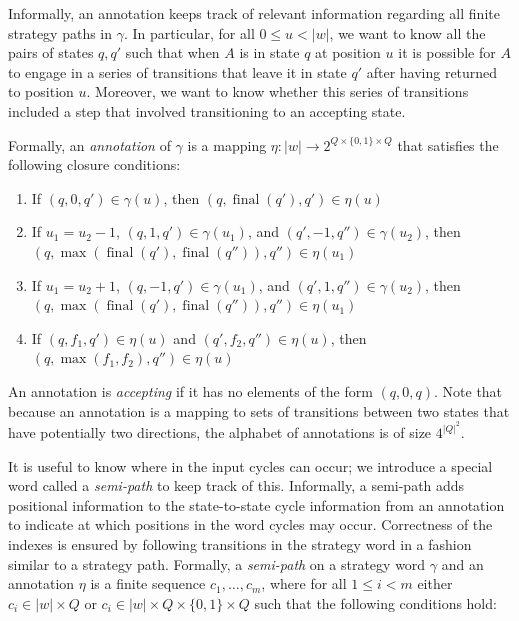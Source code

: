 \documentclass{lmcs}
\theoremstyle{definition}
\DeclareMathOperator{\?}{?}
\DeclareMathOperator{\final}{final}
\begin{document}
Informally, an annotation keeps track of relevant information regarding all finite strategy paths in $\gamma$. In particular,
for all $0 \leq u < |w|$, we want to know all the pairs of states $q,q'$ such that when $A$ is in state $q$ at
position $u$ it is possible for $A$ to engage in a series of transitions that leave it in state $q'$
after having returned to position $u$. Moreover, we want to know whether this series of transitions included a
step that involved transitioning to an accepting state.

Formally, an \textit{annotation}
of $\gamma$ is a mapping $\eta : |w| \rightarrow 2^{Q \times \{ 0,1 \} \times Q}$ that satisfies the
following closure conditions:

\begin{enumerate}
    \item If $(q,0,q') \in \gamma(u)$, then $(q,\final(q'),q') \in \eta(u)$

    \item If $u_1 = u_2 - 1$, $(q,1,q') \in \gamma(u_1)$, and $(q',-1,q'') \in \gamma(u_2)$, then $(q,\max(\final(q'),\final(q'')),\allowbreak q'') \in \eta(u_1)$

    \item If $u_1 = u_2 + 1$, $(q,-1,q') \in \gamma(u_1)$, and $(q',1,q'') \in \gamma(u_2)$, then $(q,\max(\final(q'),\final(q'')),\allowbreak q'') \in \eta(u_1)$

    \item If $(q, f_1, q') \in \eta(u)$ and $(q', f_2, q'') \in \eta(u)$, then $(q, \max(f_1,f_2),q'') \in \eta(u)$
\end{enumerate}
An annotation is \textit{accepting} if it has no elements of the form $(q,0,q)$. Note that because an annotation is a mapping to sets of transitions between two states that have potentially two directions, the alphabet of annotations is of size $4^{|Q|^2}$.

It is useful to know where in the input cycles can occur; we introduce a special word called a \emph{semi-path} to keep track of this. Informally, a semi-path adds positional information to the state-to-state cycle information from an annotation to indicate at which positions in the word cycles may occur. Correctness of the indexes is ensured by following transitions in the strategy word in a fashion similar to a strategy path. Formally, a \textit{semi-path} on a strategy word $\gamma$ and an annotation $\eta$ is a finite sequence $c_1,\ldots,c_m$, where for all $1 \leq i < m$ either $c_i \in |w| \times Q$ or $c_i \in |w| \times Q \times \{0,1\} \times Q$ such that the following conditions hold:
\end{document}

